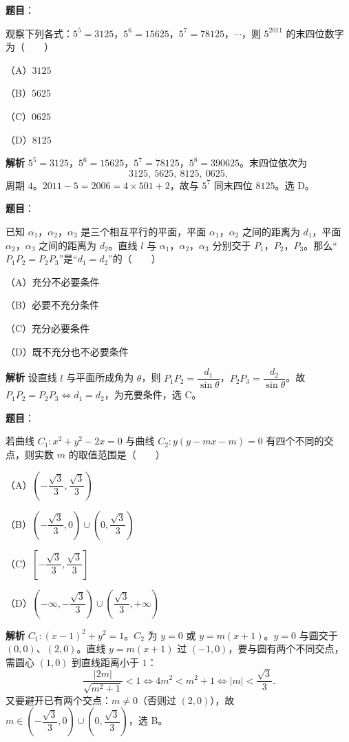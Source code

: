 \begin{answer}

\textbf{题目}：

观察下列各式：$5^5=3125$，$5^6=15625$，$5^7=78125$，$\cdots$，则 $5^{2011}$ 的末四位数字为\mbox{（　　）}

（A）$3125$

（B）$5625$

（C）$0625$

（D）$8125$

\textbf{解析}
$5^5=3125$，$5^6=15625$，$5^7=78125$，$5^8=390625$。末四位依次为
\nopagebreak[4]
\[3125,\ 5625,\ 8125,\ 0625,\]
周期 $4$。$2011-5=2006=4\times501+2$，故与 $5^7$ 同末四位 $8125$。选 D。


\end{answer}
\begin{answer}

\textbf{题目}：

已知 $\alpha_1$，$\alpha_2$，$\alpha_3$ 是三个相互平行的平面，平面 $\alpha_1$，$\alpha_2$ 之间的距离为 $d_1$，平面 $\alpha_2$，$\alpha_3$ 之间的距离为 $d_2$。直线 $l$ 与 $\alpha_1$，$\alpha_2$，$\alpha_3$ 分别交于 $P_1$，$P_2$，$P_3$。那么“$P_1P_2=P_2P_3$”是“$d_1=d_2$”的\mbox{（　　）}

（A）充分不必要条件

（B）必要不充分条件

（C）充分必要条件

（D）既不充分也不必要条件

\textbf{解析}
设直线 $l$ 与平面所成角为 $\theta$，则 $P_1P_2=\dfrac{d_1}{\sin\theta}$，$P_2P_3=\dfrac{d_2}{\sin\theta}$。故 $P_1P_2=P_2P_3\iff d_1=d_2$，为充要条件，选 C。


\end{answer}
\begin{answer}

\textbf{题目}：

若曲线 $C_1:x^2+y^2-2x=0$ 与曲线 $C_2:y(y-mx-m)=0$ 有四个不同的交点，则实数 $m$ 的取值范围是\mbox{（　　）}

（A）$\left(-\dfrac{\sqrt3}3,\dfrac{\sqrt3}3\right)$

（B）$\left(-\dfrac{\sqrt3}3,0\right)\cup\left(0,\dfrac{\sqrt3}3\right)$

（C）$\left[-\dfrac{\sqrt3}3,\dfrac{\sqrt3}3\right]$

（D）$\left(-\infty,-\dfrac{\sqrt3}3\right)\cup\left(\dfrac{\sqrt3}3,+\infty\right)$

\textbf{解析}
$C_1:(x-1)^2+y^2=1$。$C_2$ 为 $y=0$ 或 $y=m(x+1)$。$y=0$ 与圆交于 $(0,0)$、$(2,0)$。直线 $y=m(x+1)$ 过 $(-1,0)$，要与圆有两个不同交点，需圆心 $(1,0)$ 到直线距离小于 $1$：
\nopagebreak[4]
\[\frac{|2m|}{\sqrt{m^2+1}}<1\iff4m^2<m^2+1\iff|m|<\frac{\sqrt3}3.\]
又要避开已有两个交点：$m\neq0$（否则过 $(2,0)$），故 $m\in\left(-\dfrac{\sqrt3}3,0\right)\cup\left(0,\dfrac{\sqrt3}3\right)$，选 B。


\end{answer}
